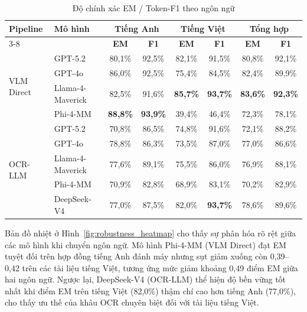 ﻿\documentclass[12pt]{report}
\begin{document}
\begin{table}[h]
\centering
\caption{Độ chính xác EM / Token-F1 theo ngôn ngữ}
\label{tab:accuracy_lang}
\footnotesize
\renewcommand{\arraystretch}{1.3}
\begin{tabular}{|l|l|cc|cc|cc|}
\hline
\multirow{2}{*}{\textbf{Pipeline}} & \multirow{2}{*}{\textbf{Mô hình}} & \multicolumn{2}{c|}{\textbf{Tiếng Anh}} & \multicolumn{2}{c|}{\textbf{Tiếng Việt}} & \multicolumn{2}{c|}{\textbf{Tổng hợp}} \\ \cline{3-8}
 &  & \textbf{EM} & \textbf{F1} & \textbf{EM} & \textbf{F1} & \textbf{EM} & \textbf{F1} \\ \hline
\multirow{4}{*}{VLM Direct} & GPT-5.2          & 80,1\% & 92,5\% & 82,1\% & 91,5\% & 80,8\% & 92,1\% \\ \cline{2-8}
 & GPT-4o                                       & 86,0\% & 92,5\% & 75,4\% & 84,5\% & 82,4\% & 89,9\% \\ \cline{2-8}
 & Llama-4-Maverick                             & 82,5\% & 91,6\% & \cellcolor{yellow!25}\textbf{85,7\%} & \cellcolor{yellow!25}\textbf{93,7\%} & \cellcolor{yellow!25}\textbf{83,6\%} & \cellcolor{yellow!25}\textbf{92,3\%} \\ \cline{2-8}
 & Phi-4-MM                                     & \cellcolor{yellow!25}\textbf{88,8\%} & \cellcolor{yellow!25}\textbf{93,9\%} & 39,4\% & 46,4\% & 72,3\% & 78,1\% \\ \hline
\multirow{5}{*}{OCR-LLM}    & GPT-5.2          & 70,8\% & 86,5\% & 74,8\% & 91,6\% & 72,1\% & 88,2\% \\ \cline{2-8}
 & GPT-4o                                       & 78,8\% & 86,3\% & 73,5\% & 87,0\% & 77,0\% & 86,6\% \\ \cline{2-8}
 & Llama-4-Maverick                             & 77,6\% & 89,1\% & 75,5\% & 86,0\% & 76,9\% & 88,1\% \\ \cline{2-8}
 & Phi-4-MM                                     & 70,9\% & 82,8\% & 68,9\% & 83,1\% & 70,2\% & 82,9\% \\ \cline{2-8}
 & DeepSeek-V4                                  & 77,0\% & 87,5\% & 82,0\% & \cellcolor{yellow!25}\textbf{93,7\%} & 78,6\% & 89,6\% \\ \hline
\end{tabular}
\end{table}

Bản đồ nhiệt ở Hình~\ref{fig:robustness_heatmap} cho thấy sự phân hóa rõ rệt giữa các mô hình khi chuyển ngôn ngữ. Mô hình Phi-4-MM (VLM Direct) đạt EM tuyệt đối trên hợp đồng tiếng Anh đánh máy nhưng sụt giảm xuống còn 0,39--0,42 trên các tài liệu tiếng Việt, tương ứng mức giảm khoảng 0,49 điểm EM giữa hai ngôn ngữ. Ngược lại, DeepSeek-V4 (OCR-LLM) thể hiện độ bền vững tốt nhất khi điểm EM trên tiếng Việt (82,0\%) thậm chí cao hơn tiếng Anh (77,0\%), cho thấy ưu thế của khâu OCR chuyên biệt đối với tài liệu tiếng Việt.
\end{document}
